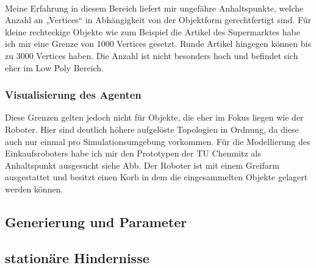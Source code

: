 \\
Meine Erfahrung in diesem Bereich liefert mir ungefähre Anhaltspunkte, welche Anzahl an „Vertices“ in Abhängigkeit von der Objektform gerechtfertigt sind. Für kleine rechteckige Objekte wie zum Beispiel die Artikel des Supermarktes habe ich mir eine Grenze von 1000 Vertices gesetzt. Runde Artikel hingegen können bis zu 3000 Vertices haben. Die Anzahl ist nicht besonders hoch und befindet sich eher im Low Poly Bereich.

\subsubsection{Visualisierung des Agenten}
\label{vis_agent}
Diese Grenzen gelten jedoch nicht für Objekte, die eher im Fokus liegen wie der Roboter. Hier sind deutlich höhere aufgelöste Topologien in Ordnung, da diese auch nur einmal pro Simulationsumgebung vorkommen. Für die Modellierung des Einkaufsroboters habe ich mir den Prototypen der TU Chemnitz als Anhaltspunkt ausgesucht siehe Abb. Der Roboter ist mit einem Greifarm ausgestattet und besitzt einen Korb in dem die eingesammelten Objekte gelagert werden können. 

\subsection{Generierung und Parameter}
\subsection{stationäre Hindernisse}
